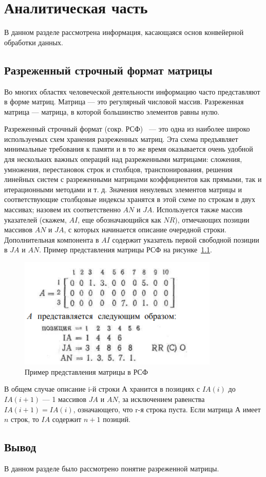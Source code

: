 \chapter{Аналитическая часть}
В данном разделе рассмотрена информация, касающаяся основ конвейерной обработки данных.

\section{Разреженный строчный формат матрицы}

Во многих областях человеческой деятельности информацию
часто представляют в форме матриц. Матрица --- это регулярный
числовой массив. Разреженная  матрица --- матрица, в которой большинство элементов равны нулю.

Разреженный строчный формат (сокр. РСФ)~\cite{csr} --- это одна из наиболее широко используемых схем хранения разреженных матриц.
Эта схема предъявляет минимальные требования к памяти и в то же
время оказывается очень удобной для нескольких важных операций над разреженными матрицами: сложения, умножения,
перестановок строк и столбцов, транспонирования, решения линейных систем с разреженными матрицами коэффициентов как
прямыми, так и итерационными методами и т. д. 
Значения ненулевых элементов матрицы и соответствующие столбцовые индексы хранятся в этой схеме по строкам в двух массивах; назовем их соответственно $AN$ и $JA$. 
Используется также массив указателей (скажем, $AI$, еще обозначающийся как $NR$), отмечающих позиции массивов $AN$ и $JA$, с которых начинается описание очередной строки. Дополнительная компонента в $AI$ содержит указатель первой свободной позиции в $JA$ и $AN$. 
Пример представления матрицы РСФ на рисунке~\ref{fig:ex-csr}.

\clearpage

\begin{figure}[h]
	\centering
	\includegraphics[width=0.85\textwidth]{img/example_csr.png}
	\caption{Пример представления матрицы в РСФ}
	\label{fig:ex-csr}
\end{figure}

В общем случае описание i-й строки $А$ хранится в позициях с $IA(i)$ до $IA(i + 1)$ --- 1 массивов $JA$ и $AN$, за исключением
равенства $IA(i + 1) = IA(i)$, означающего, что r-я строка пуста.
Если матрица $А$ имеет $n$ строк, то $IA$ содержит $n + 1$ позиций. 

\section*{Вывод}
В данном разделе было рассмотрено понятие разреженной матрицы.
